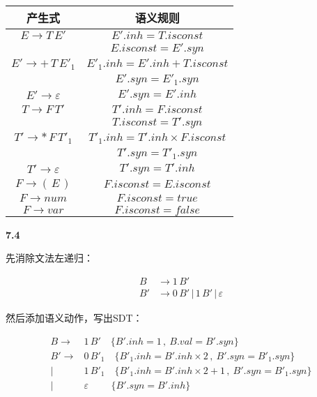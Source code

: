 \documentclass[UTF8]{report}
\newcommand{\tbf}[1]{\textbf{#1}}
\begin{document}
\begin{table}[H]
    \centering
    \begin{tabular}{|c|c|}
        \hline
        \textbf{产生式} & \textbf{语义规则} \\
        \hline
        $E \to T \, E'$ & $E'.inh = T.isconst$ \\
        & $E.isconst = E'.syn$ \\
        \hline
        $E' \to + \, T \, E'_1$ & $E'_1.inh = E'.inh + T.isconst$ \\
        & $E'.syn = E'_1.syn$ \\
        \hline
        $E' \to \varepsilon$ & $E'.syn = E'.inh$ \\
        \hline
        $T \to F \, T'$ & $T'.inh = F.isconst$ \\
        & $T.isconst = T'.syn$ \\
        \hline
        $T' \to * \, F \, T'_1$ & $T'_1.inh = T'.inh \times F.isconst$ \\
        & $T'.syn = T'_1.syn$ \\
        \hline
        $T' \to \varepsilon$ & $T'.syn = T'.inh$ \\
        \hline
        $F \to ( \, E \, )$ & $F.isconst = E.isconst$ \\
        \hline
        $F \to num$ & $F.isconst = true$ \\
        \hline
        $F \to var$ & $F.isconst = false$ \\
        \hline
    \end{tabular}
\end{table}

\noindent
\tbf{7.4}

先消除文法左递归：

\begin{align*}
    B &\to 1 \, B' \\
    B' &\to 0 \, B' \, | \, 1 \, B' \, | \, \varepsilon
\end{align*}

然后添加语义动作，写出SDT：

\begin{align*}
    B \to &1 \, B' \quad \{B'.inh = 1 \,,\ B.val = B'.syn\} \\
    B' \to &0 \, B'_1 \quad \{B'_1.inh = B'.inh \times 2 \,,\ B'.syn = B'_1.syn\} \\
    | \, &1 \, B'_1 \quad \{B'_1.inh = B'.inh \times 2 + 1 \,,\ B'.syn = B'_1.syn\} \\
    | \, &\varepsilon \quad \,\,\,\,\,\,\,\, \{B'.syn = B'.inh\}
\end{align*}
\end{document}
